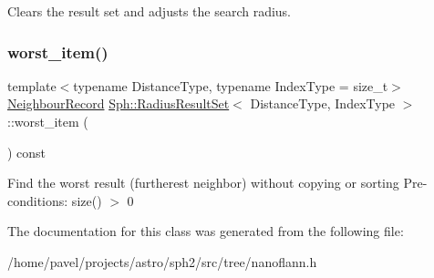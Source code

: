 Clears the result set and adjusts the search radius. \hypertarget{classSph_1_1RadiusResultSet_ac6e69e0729bcdca7191dc0ef92b98797}{}\label{classSph_1_1RadiusResultSet_ac6e69e0729bcdca7191dc0ef92b98797} 
\subsubsection{\texorpdfstring{worst\+\_\+item()}{worst\_item()}}
{\footnotesize\ttfamily template$<$typename Distance\+Type, typename Index\+Type = size\+\_\+t$>$ \\
\hyperlink{structNeighbourRecord}{Neighbour\+Record} \hyperlink{classSph_1_1RadiusResultSet}{Sph\+::\+Radius\+Result\+Set}$<$ Distance\+Type, Index\+Type $>$\+::worst\+\_\+item (\begin{DoxyParamCaption}{ }\end{DoxyParamCaption}) const\hspace{0.3cm}{\ttfamily [inline]}}

Find the worst result (furtherest neighbor) without copying or sorting Pre-\/conditions\+: size() $>$ 0 

The documentation for this class was generated from the following file\+:\begin{DoxyCompactItemize}
\item 
/home/pavel/projects/astro/sph2/src/tree/nanoflann.\+h\end{DoxyCompactItemize}
